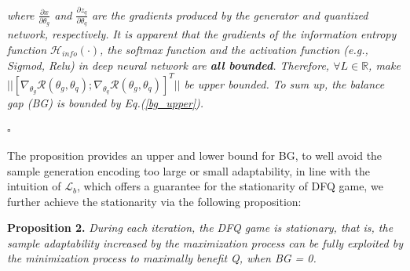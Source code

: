 \noindent \emph{where $\frac{\partial x}{\partial \theta_g}$ and $\frac{\partial z_q}{\partial \theta_q}$ are the gradients produced by the generator and quantized network, respectively. }
\emph{It is apparent that the gradients of the information entropy function $\mathcal{H}_{info}(\cdot)$, the softmax function and the activation function ({e.g.}, Sigmod, Relu) in deep neural network are \textbf{all bounded}. Therefore, $\forall L \in \mathbb{R}$, make $|| [\nabla_{\theta_g} \mathcal{R}(\theta_g,\theta_q);\nabla_{\theta_q} \mathcal{R}(\theta_g,\theta_q)]^T|| $ be upper bounded.   }
\noindent \emph{To sum up, the balance gap (BG) is bounded by Eq.(\ref{bg_upper}). }

 \hfill $\square$

The proposition provides an upper and lower bound for BG, to well avoid the sample generation encoding too large or small adaptability, in line with the intuition of $\mathcal{L}_b$, which offers a guarantee for the stationarity of DFQ game, we further achieve the stationarity via the following proposition:

\noindent \textbf{Proposition 2.} \emph{During each iteration, the DFQ game is stationary, that is, the sample adaptability increased by the maximization process can be fully exploited by the minimization process to maximally benefit Q, when BG = 0. }


